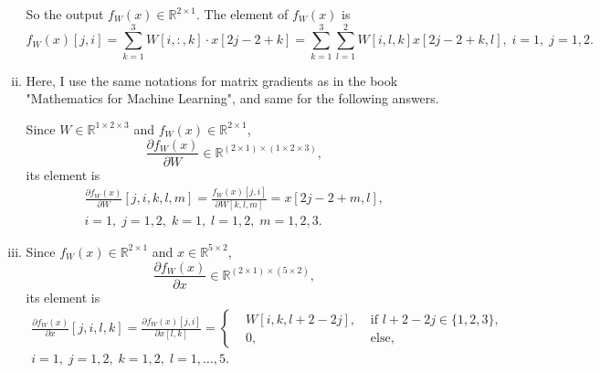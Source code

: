 \documentclass[10pt,a4paper]{article}
\theoremstyle{dotlessP}
\def\RR{\mathbb{R}}
\begin{document}
\begin{enumerate}[(a)]
\begin{enumerate}[(i)]
		So the output $f_W(x)\in\RR^{2\times 1}$. The element of $f_W(x)$ is 
		\begin{equation}
		f_W(x)[j,i] = \sum_{k=1}^{3} W[i,:,k] \cdot x[2j-2+k]=\sum_{k=1}^{3} \sum_{l=1}^2W[i,l,k] x[2j-2+k,l],\;i=1,\; j=1,2.
		\end{equation}
	
		
		
		\item Here, I use the same notations for matrix gradients as in the book "Mathematics for Machine Learning", and same for the following answers.
		
		Since $W\in\RR^{1\times 2\times 3}$ and $f_W(x)\in\RR^{2\times 1}$,
		\begin{equation}
		\frac{\partial f_W(x)}{\partial W}\in \RR^{(2\times 1)\times (1\times 2\times 3)},
		\end{equation}
		its element is 
		\begin{equation}
		\begin{aligned}
		\frac{\partial f_W(x)}{\partial W}[j,i,k,l,m]=\frac{f_W(x)[j,i]}{\partial W[k,l,m]}
=  x[2j-2+m,l],\\
		 i=1,\; j=1,2,\; k=1,\; l=1,2,\;m=1,2,3.
		\end{aligned}
		\end{equation}
		
		\item Since $f_W(x)\in\RR^{2\times 1}$ and $x\in\RR^{5\times 2}$, 
		\begin{equation}
		\frac{\partial f_W(x)}{\partial x}\in\RR^{(2\times 1) \times (5\times 2) },
		\end{equation}
		its element is 
		\begin{equation*}
		\begin{aligned}
		\frac{\partial f_W(x)}{\partial x}[j,i,l,k]=\frac{\partial f_W(x)[j,i]}{\partial x[l,k]}=\left\lbrace 
		\begin{aligned}
	&	W[i,k,l+2-2j], & \text{ if } l+2-2j\in\{1,2,3\},\\
	&	0, & \text{ else,}
		\end{aligned}
		\right. \\i=1,\; j=1,2, \; k=1,2, \; l=1,\ldots, 5.
		\end{aligned}
		\end{equation*}
		

\end{enumerate}
\end{enumerate}
\end{document}
